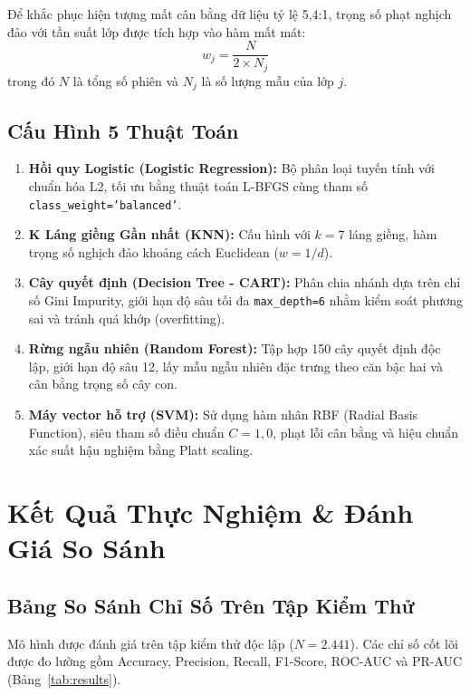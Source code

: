 \documentclass[11pt,a4paper]{article}
\begin{document}
Để khắc phục hiện tượng mất cân bằng dữ liệu tỷ lệ 5,4:1, trọng số phạt nghịch đảo với tần suất lớp được tích hợp vào hàm mất mát:
\begin{equation}
    w_j = \frac{N}{2 \times N_j}
\end{equation}
trong đó $N$ là tổng số phiên và $N_j$ là số lượng mẫu của lớp $j$.

\subsection{Cấu Hình 5 Thuật Toán}
\begin{enumerate}
    \item \textbf{Hồi quy Logistic (Logistic Regression):} Bộ phân loại tuyến tính với chuẩn hóa L2, tối ưu bằng thuật toán L-BFGS cùng tham số \texttt{class\_weight='balanced'}.
    \item \textbf{K Láng giềng Gần nhất (KNN):} Cấu hình với $k=7$ láng giềng, hàm trọng số nghịch đảo khoảng cách Euclidean ($w = 1/d$).
    \item \textbf{Cây quyết định (Decision Tree - CART):} Phân chia nhánh dựa trên chỉ số Gini Impurity, giới hạn độ sâu tối đa \texttt{max\_depth=6} nhằm kiểm soát phương sai và tránh quá khớp (overfitting).
    \item \textbf{Rừng ngẫu nhiên (Random Forest):} Tập hợp 150 cây quyết định độc lập, giới hạn độ sâu 12, lấy mẫu ngẫu nhiên đặc trưng theo căn bậc hai và cân bằng trọng số cây con.
    \item \textbf{Máy vector hỗ trợ (SVM):} Sử dụng hàm nhân RBF (Radial Basis Function), siêu tham số điều chuẩn $C=1,0$, phạt lỗi cân bằng và hiệu chuẩn xác suất hậu nghiệm bằng Platt scaling.
\end{enumerate}

\section{Kết Quả Thực Nghiệm \& Đánh Giá So Sánh}

\subsection{Bảng So Sánh Chỉ Số Trên Tập Kiểm Thử}
Mô hình được đánh giá trên tập kiểm thử độc lập ($N=2.441$). Các chỉ số cốt lõi được đo lường gồm Accuracy, Precision, Recall, F1-Score, ROC-AUC và PR-AUC (Bảng~\ref{tab:results}).
\end{document}
